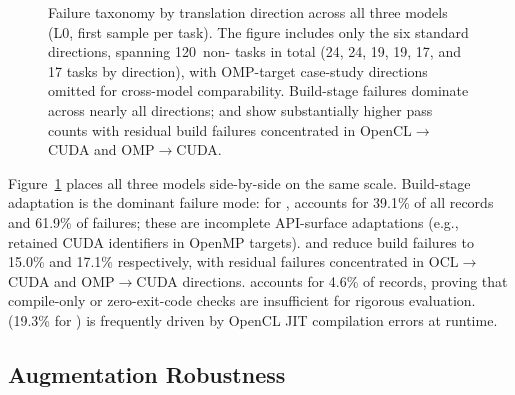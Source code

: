 \begin{figure}[t]
\centering

%
\caption{Failure taxonomy by translation direction across all three models (L0, first sample per task). The figure includes only the six standard directions, spanning 120~non-\knownfail{} tasks in total (24, 24, 19, 19, 17, and 17 tasks by direction), with OMP-target case-study directions omitted for cross-model comparability. Build-stage failures dominate \qwenshort{} across nearly all directions; \gptnew{} and \codex{} show substantially higher pass counts with residual build failures concentrated in OpenCL$\to$CUDA and OMP$\to$CUDA.}
\label{fig:failure-taxonomy}
\end{figure}


Figure~\ref{fig:failure-taxonomy} places all three models side-by-side on the same scale. Build-stage adaptation is the dominant failure mode: for \qwenshort{}, \buildfail{} accounts for 39.1\% of all records and 61.9\% of failures; these are incomplete API-surface adaptations (e.g., retained CUDA identifiers in OpenMP targets). \gptnew{} and \codex{} reduce build failures to 15.0\% and 17.1\% respectively, with residual failures concentrated in OCL$\to$CUDA and OMP$\to$CUDA directions. \verifyfail{} accounts for 4.6\% of \qwenshort{} records, proving that compile-only or zero-exit-code checks are insufficient for rigorous evaluation. \runfail{} (19.3\% for \qwenshort{}) is frequently driven by OpenCL JIT compilation errors at runtime.
  
\subsection{Augmentation Robustness}
\label{sec:augmentation-robustness}

